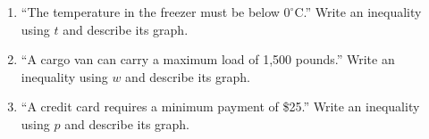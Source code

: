 \documentclass[12pt, letterpaper, fleqn]{article}
\begin{document}
\begin{enumerate}[itemsep=2.2cm, leftmargin=0.6cm]

\item ``The temperature in the freezer must be below $0^\circ\text{C}$.'' Write an inequality using $t$ and describe its graph.

\vspace{2.2cm}

\item ``A cargo van can carry a maximum load of 1,500 pounds.'' Write an inequality using $w$ and describe its graph.

\vspace{2.2cm}

\item ``A credit card requires a minimum payment of \$25.'' Write an inequality using $p$ and describe its graph.

\vspace{2.2cm}

\end{enumerate}
\end{document}

